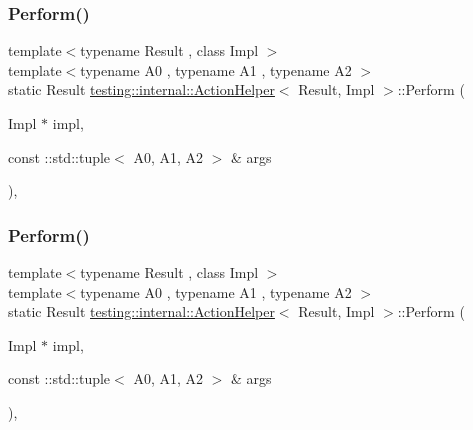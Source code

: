 \subsubsection{\texorpdfstring{Perform()}{Perform()}\hspace{0.1cm}{\footnotesize\ttfamily [7/33]}}
{\footnotesize\ttfamily template$<$typename Result , class Impl $>$ \\
template$<$typename A0 , typename A1 , typename A2 $>$ \\
static Result \mbox{\hyperlink{classtesting_1_1internal_1_1_action_helper}{testing\+::internal\+::\+Action\+Helper}}$<$ Result, Impl $>$\+::Perform (\begin{DoxyParamCaption}\item[{Impl $\ast$}]{impl,  }\item[{const \+::std\+::tuple$<$ A0, A1, A2 $>$ \&}]{args }\end{DoxyParamCaption})\hspace{0.3cm}{\ttfamily [inline]}, {\ttfamily [static]}}

\mbox{\label{classtesting_1_1internal_1_1_action_helper_a1f47357f6879b2517b60a3de30c2c634}} 
\subsubsection{\texorpdfstring{Perform()}{Perform()}\hspace{0.1cm}{\footnotesize\ttfamily [8/33]}}
{\footnotesize\ttfamily template$<$typename Result , class Impl $>$ \\
template$<$typename A0 , typename A1 , typename A2 $>$ \\
static Result \mbox{\hyperlink{classtesting_1_1internal_1_1_action_helper}{testing\+::internal\+::\+Action\+Helper}}$<$ Result, Impl $>$\+::Perform (\begin{DoxyParamCaption}\item[{Impl $\ast$}]{impl,  }\item[{const \+::std\+::tuple$<$ A0, A1, A2 $>$ \&}]{args }\end{DoxyParamCaption})\hspace{0.3cm}{\ttfamily [inline]}, {\ttfamily [static]}}

